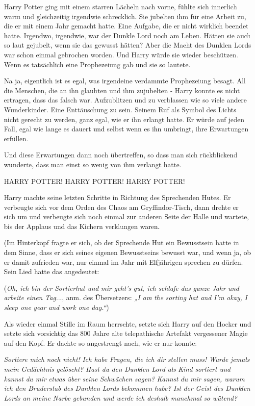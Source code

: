 Harry Potter ging mit einem starren Lächeln nach vorne, fühlte sich innerlich
warm und gleichzeitig irgendwie schrecklich. Sie jubelten ihm für eine Arbeit
zu, die er mit einem Jahr gemacht hatte. Eine Aufgabe, die er nicht wirklich
beendet hatte. Irgendwo, irgendwie, war der Dunkle Lord noch am Leben. Hätten
sie auch so laut gejubelt, wenn sie das gewusst hätten? Aber die Macht des
Dunklen Lords war schon einmal gebrochen worden. Und Harry würde sie wieder
beschützen. Wenn es tatsächlich eine Prophezeiung gab und sie so lautete.

Na ja, eigentlich ist es egal, was irgendeine verdammte Prophezeiung besagt. All
die Menschen, die an ihn glaubten und ihm zujubelten - Harry konnte es nicht
ertragen, dass das falsch war. Aufzublitzen und zu verblassen wie so viele
andere Wunderkinder. Eine Enttäuschung zu sein. Seinem Ruf als Symbol des Lichts
nicht gerecht zu werden, ganz egal, wie er ihn erlangt hatte. Er würde auf jeden
Fall, egal wie lange es dauert und selbst wenn es ihn umbringt, ihre Erwartungen
erfüllen.

Und diese Erwartungen dann noch übertreffen, so dass man sich rückblickend
wunderte, dass man einst so wenig von ihm verlangt hatte.

\glqq HARRY POTTER! HARRY POTTER! HARRY POTTER!\grqq{}

Harry machte seine letzten Schritte in Richtung des Sprechenden Hutes. Er
verbeugte sich vor dem Orden des Chaos am Gryffindor-Tisch, dann drehte er sich
um und verbeugte sich noch einmal zur anderen Seite der Halle und wartete, bis
der Applaus und das Kichern verklungen waren.

(Im Hinterkopf fragte er sich, ob der Sprechende Hut ein Bewusstsein hatte in
dem Sinne, dass er sich seines eigenen Bewusstseins bewusst war, und wenn ja, ob
er damit zufrieden war, nur einmal im Jahr mit Elfjährigen sprechen zu dürfen.
Sein Lied hatte das angedeutet:

(\emph{Oh, ich bin der Sortierhut und mir geht's gut, ich schlafe das ganze Jahr
und arbeite einen Tag.}.., anm. des Übersetzers: \emph{„I am the sorting hat and
I'm okay, I sleep one year and work one day.“})

Als wieder einmal Stille im Raum herrschte, setzte sich Harry auf den Hocker und
setzte sich vorsichtig das 800 Jahre alte telepathische Artefakt vergessener
Magie auf den Kopf. Er dachte so angestrengt nach, wie er nur konnte:

\emph{Sortiere mich noch nicht! Ich habe Fragen, die ich dir stellen muss!}
\emph{Wurde jemals mein Gedächtnis gelöscht? Hast du den Dunklen Lord als Kind
sortiert und kannst du mir etwas über seine Schwächen sagen? } \emph{Kannst du
mir sagen, warum ich den Bruderstab des Dunklen Lords bekommen habe? } \emph{Ist
der Geist des Dunklen Lords an meine Narbe gebunden und werde ich deshalb
manchmal so wütend? }

